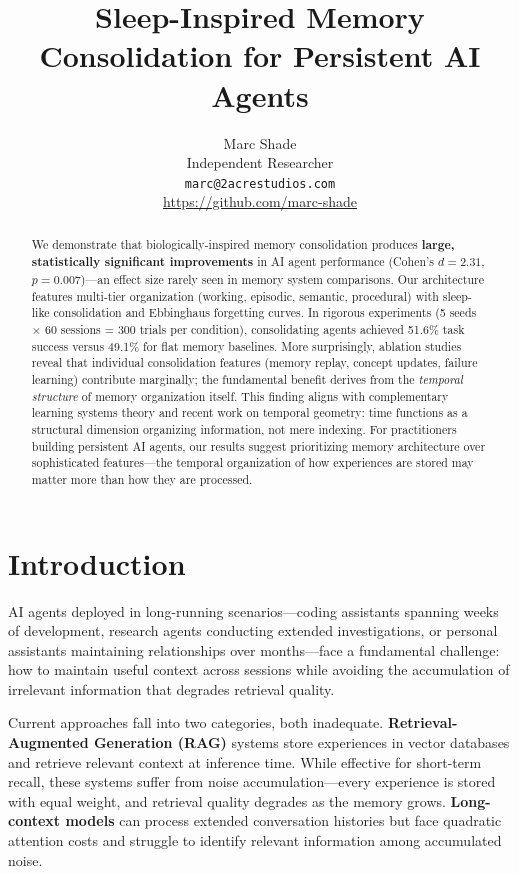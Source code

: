 \documentclass[11pt]{article}
\title{Sleep-Inspired Memory Consolidation for Persistent AI Agents}
\author{
  Marc Shade \\
  Independent Researcher \\
  \texttt{marc@2acrestudios.com} \\
  \url{https://github.com/marc-shade}
}
\date{}
\begin{document}
\maketitle

\begin{abstract}
We demonstrate that biologically-inspired memory consolidation produces \textbf{large, statistically significant improvements} in AI agent performance (Cohen's $d=2.31$, $p=0.007$)---an effect size rarely seen in memory system comparisons. Our architecture features multi-tier organization (working, episodic, semantic, procedural) with sleep-like consolidation and Ebbinghaus forgetting curves. In rigorous experiments (5 seeds $\times$ 60 sessions = 300 trials per condition), consolidating agents achieved 51.6\% task success versus 49.1\% for flat memory baselines. More surprisingly, ablation studies reveal that individual consolidation features (memory replay, concept updates, failure learning) contribute marginally; the fundamental benefit derives from the \textit{temporal structure} of memory organization itself. This finding aligns with complementary learning systems theory and recent work on temporal geometry: time functions as a structural dimension organizing information, not mere indexing. For practitioners building persistent AI agents, our results suggest prioritizing memory architecture over sophisticated features---the temporal organization of how experiences are stored may matter more than how they are processed.
\end{abstract}

\section{Introduction}

AI agents deployed in long-running scenarios---coding assistants spanning weeks of development, research agents conducting extended investigations, or personal assistants maintaining relationships over months---face a fundamental challenge: how to maintain useful context across sessions while avoiding the accumulation of irrelevant information that degrades retrieval quality.

Current approaches fall into two categories, both inadequate. \textbf{Retrieval-Augmented Generation (RAG)} systems store experiences in vector databases and retrieve relevant context at inference time. While effective for short-term recall, these systems suffer from noise accumulation---every experience is stored with equal weight, and retrieval quality degrades as the memory grows. \textbf{Long-context models} can process extended conversation histories but face quadratic attention costs and struggle to identify relevant information among accumulated noise.
\end{document}
